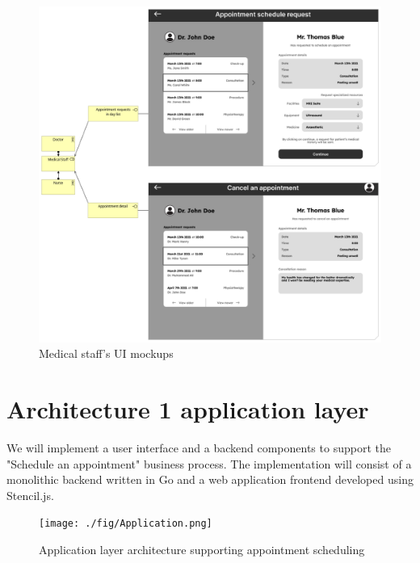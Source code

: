\documentclass[11pt,english,a4paper,twoside]{article}
\begin{document}
\begin{figure}[H]
    \centering
    \includegraphics[width=\textwidth]{./fig/Business Frontend Medical staff.png}
    \caption{Medical staff's UI mockups}
    \label{fig:medical-staff-mockups}
\end{figure}

\section{Architecture 1 application layer}

We will implement a user interface and a backend components to
support the "Schedule an appointment" business process. The implementation
will consist of a monolithic backend written in Go and a web application
frontend developed using Stencil.js.

\begin{figure}[H]
    \centering
    \texttt{[image: ./fig/Application.png]}
    \caption{Application layer architecture supporting appointment scheduling}
    \label{fig:application-layer}
\end{figure}
%
%
\end{document}
